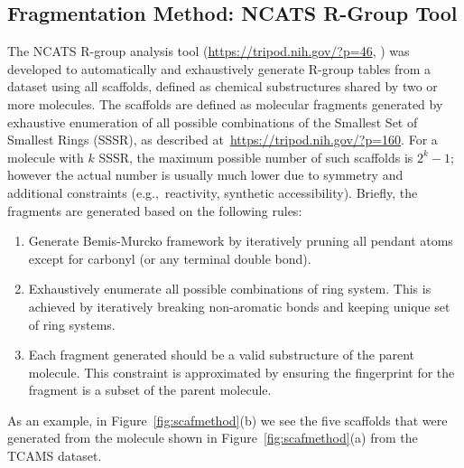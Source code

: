\documentclass[journal=jacsat,biochem,manuscript=article]{achemso}
\newcommand*\fref[1]{Figure~\ref{fig:#1}}
\newcommand*\eg{e.g.,~}
\begin{document}
\subsection{Fragmentation Method: NCATS R-Group Tool}
\label{sec:rgtool}
The NCATS R-group analysis tool (\url{https://tripod.nih.gov/?p=46}, \cite{RGTool})
was developed to automatically and exhaustively generate R-group
tables from a dataset using all scaffolds, defined as chemical
substructures shared by two or more molecules. The scaffolds are
defined as molecular fragments generated by exhaustive enumeration of
all possible combinations of the Smallest Set of Smallest Rings
(SSSR), as described at~\url{https://tripod.nih.gov/?p=160}. For a
molecule with $k$ SSSR, the maximum possible number of such scaffolds
is $2^k - 1$; however the actual number is usually much lower due to
symmetry and additional constraints (\eg reactivity, synthetic
accessibility). Briefly, the fragments are generated based on the
following rules:
\begin{enumerate}
  \item Generate Bemis-Murcko framework by iteratively pruning all pendant atoms
    except for carbonyl (or any terminal double bond).
  \item Exhaustively enumerate all possible combinations of ring
    system. This is achieved by iteratively breaking non-aromatic
    bonds and keeping unique set of ring systems.
  \item Each fragment generated should be a valid substructure of the
    parent molecule. This constraint is approximated by ensuring the
    fingerprint for the fragment is a subset of the parent molecule.
\end{enumerate}

As an example, in \fref{scafmethod}(b) we see the five scaffolds that
were generated from the molecule shown in \fref{scafmethod}(a) from
the TCAMS dataset.
\end{document}
